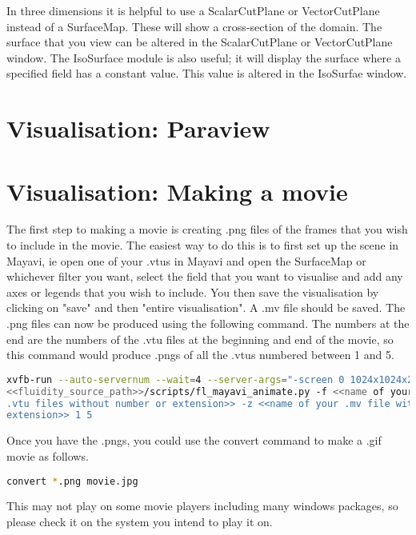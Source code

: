 In three dimensions it is helpful to use a ScalarCutPlane or VectorCutPlane instead of a SurfaceMap. These will show a cross-section of the domain. The surface that you view can be altered in the ScalarCutPlane or VectorCutPlane window.  The IsoSurface module is also useful; it will display the surface where a specified field has a constant value. This value is altered in the IsoSurfae window.  
 

\section{Visualisation: Paraview}
\label{sect:paraview}


\section{Visualisation: Making a movie}
\label{sect:making_a_movie}

The first step to making a movie is creating .png files of the frames that you wish to include in the movie. The easiest way to do this is to first set up the scene in Mayavi, ie open one of your .vtus in Mayavi and open the SurfaceMap or whichever filter you want, select the field that you want to visualise and add any axes or legends that you wish to include. You then save the visualisation by clicking on "save" and then "entire visualisation". A .mv file should be saved. The .png files can now be produced using the following command. The numbers at the end are the numbers of the .vtu files at the beginning and end of the movie, so this command would produce .pngs of all the .vtus numbered between 1 and 5.
\begin{lstlisting}[language=bash]
xvfb-run --auto-servernum --wait=4 --server-args="-screen 0 1024x1024x24" 
<<fluidity_source_path>>/scripts/fl_mayavi_animate.py -f <<name of your 
.vtu files without number or extension>> -z <<name of your .mv file with 
extension>> 1 5
\end{lstlisting}
Once you have the .pngs, you could use the convert command to make a .gif movie as follows.
\begin{lstlisting}[language=bash]
convert *.png movie.jpg
\end{lstlisting}
This may not play on some movie players including many windows packages, so please check it on the system you intend to play it on.

